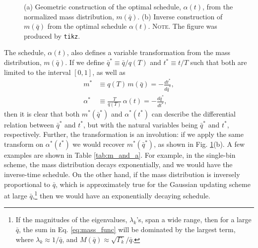 \documentclass[preprint, superscriptaddress, floatfix]{revtex4-1}
\newcommand{\note}[1]{{\color{DarkGreen}\footnotesize \textsc{Note.} #1}}
\begin{document}
\begin{figure}[h]
\begin{center}
  \caption{
    \label{fig:massq}
    (a) Geometric construction of the optimal schedule,
    $\alpha(t)$,
    from the normalized mass distribution,
    $m(\bar q)$.
    (b) Inverse construction of $m(\bar q)$
    from the optimal schedule $\alpha(t)$.
    \note{
      The figure was produced by \texttt{tikz}.
    }%
  }
\end{center}
\end{figure}

The schedule, $\alpha(t)$,
also defines a variable transformation from
the mass distribution, $m(\bar q)$.
%
If we define
$\bar q^* \equiv \bar q/q(T)$
and $t^* \equiv t/T$
such that both are limited to the interval $[0, 1]$,
as well as
\begin{align*}
  m^*       &\equiv q(T) \, m(\bar q) = -\frac{ dt^* } { d\bar q^* },
  \\
  \alpha^*  &\equiv \frac{T}{q(T)} \, \alpha(t) = -\frac{ d\bar q^* } { dt^* },
\end{align*}
then it is clear that
both $m^*(\bar q^*)$ and $\alpha^*(t^*)$
can describe the differential relation
between $\bar q^*$ and $t^*$,
but with the natural variables
being $\bar q^*$ and $t^*$, respectively.
%
Further, the transformation is an involution:
if we apply the same transform on $\alpha^*(t^*)$
we would recover $m^*(\bar q^*)$,
as shown in Fig. \ref{fig:massq}(b).
%
A few examples are shown in Table \ref{tab:m_and_a}.
%
For example, in the single-bin scheme,
the mass distribution decays exponentially,
and we would have the inverse-time schedule.
%
On the other hand,
if the mass distribution is inversely proportional to $\bar q$,
which is approximately true for the Gaussian updating scheme
at large $\bar q$,\footnote{If
  the magnitudes of the eigenvalues, $\lambda_k$'s,
  span a wide range, then for a large $\bar q$,
  the sum in Eq. \eqref{eq:mass_func} will be dominated by
  the largest term, where $\lambda_k \approx 1/\bar q$,
  and $M(\bar q) \approx \sqrt{\Gamma_k}/\bar q$.
  }
then we would have an exponentially decaying schedule.
\end{document}
